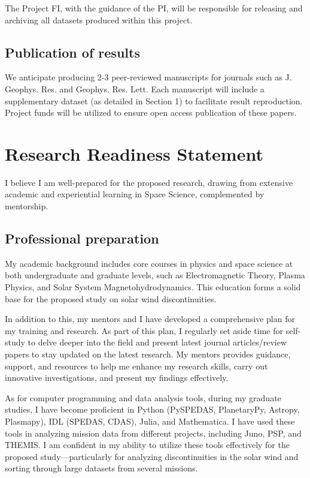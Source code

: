 \documentclass[
  letterpaper,
  DIV=11,
  numbers=noendperiod]{scrartcl}
\begin{document}
The Project FI, with the guidance of the PI, will be responsible for
releasing and archiving all datasets produced within this project.

\subsection{Publication of results}\label{publication-of-results}

We anticipate producing 2-3 peer-reviewed manuscripts for journals such
as J. Geophys. Res. and Geophys. Res. Lett. Each manuscript will include
a supplementary dataset (as detailed in Section 1) to facilitate result
reproduction. Project funds will be utilized to ensure open access
publication of these papers.

\section{Research Readiness
Statement}\label{research-readiness-statement}

I believe I am well-prepared for the proposed research, drawing from
extensive academic and experiential learning in Space Science,
complemented by mentorship.

\subsection{Professional preparation}\label{professional-preparation}

My academic background includes core courses in physics and space
science at both undergraduate and graduate levels, such as
Electromagnetic Theory, Plasma Physics, and Solar System
Magnetohydrodynamics. This education forms a solid base for the proposed
study on solar wind discontinuities.

In addition to this, my mentors and I have developed a comprehensive
plan for my training and research. As part of this plan, I regularly set
aside time for self-study to delve deeper into the field and present
latest journal articles/review papers to stay updated on the latest
research. My mentors provides guidance, support, and resources to help
me enhance my research skills, carry out innovative investigations, and
present my findings effectively.

As for computer programming and data analysis tools, during my graduate
studies, I have become proficient in Python (PySPEDAS, PlanetaryPy,
Astropy, Plasmapy), IDL (SPEDAS, CDAS), Julia, and Mathematica. I have
used these tools in analyzing mission data from different projects,
including Juno, PSP, and THEMIS. I am confident in my ability to utilize
these tools effectively for the proposed study---particularly for
analyzing discontinuities in the solar wind and sorting through large
datasets from several missions.
\end{document}
